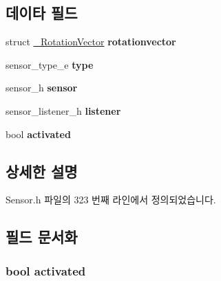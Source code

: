 \subsection*{데이타 필드}
\begin{DoxyCompactItemize}
\item 
\hypertarget{struct__RotationVectorExtend_a273e40af4ef4690cbb95f7f77b6ef54e}{struct \hyperlink{struct__RotationVector}{\-\_\-\-Rotation\-Vector} {\bfseries rotationvector}}\label{struct__RotationVectorExtend_a273e40af4ef4690cbb95f7f77b6ef54e}

\item 
\hypertarget{struct__RotationVectorExtend_abffb09766da2fc510a79bb51f82a36e1}{sensor\-\_\-type\-\_\-e {\bfseries type}}\label{struct__RotationVectorExtend_abffb09766da2fc510a79bb51f82a36e1}

\item 
\hypertarget{struct__RotationVectorExtend_a5bae9b7801bc3808411925cde81d3f26}{sensor\-\_\-h {\bfseries sensor}}\label{struct__RotationVectorExtend_a5bae9b7801bc3808411925cde81d3f26}

\item 
\hypertarget{struct__RotationVectorExtend_aa977dfb866b24fd7d9a20a9a01b2fd1f}{sensor\-\_\-listener\-\_\-h {\bfseries listener}}\label{struct__RotationVectorExtend_aa977dfb866b24fd7d9a20a9a01b2fd1f}

\item 
\hypertarget{struct__RotationVectorExtend_a73e9fa0c3543560192f38a8ab6a78c47}{bool {\bfseries activated}}\label{struct__RotationVectorExtend_a73e9fa0c3543560192f38a8ab6a78c47}

\end{DoxyCompactItemize}


\subsection{상세한 설명}


Sensor.\-h 파일의 323 번째 라인에서 정의되었습니다.



\subsection{필드 문서화}
\hypertarget{struct__RotationVectorExtend_a73e9fa0c3543560192f38a8ab6a78c47}{
\subsubsection[{activated}]{\setlength{\rightskip}{0pt plus 5cm}bool activated}}\label{struct__RotationVectorExtend_a73e9fa0c3543560192f38a8ab6a78c47}


